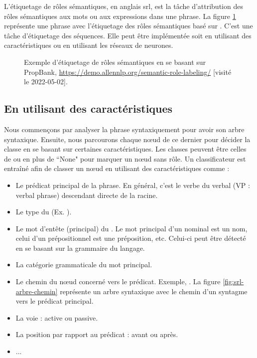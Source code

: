 \documentclass{KodeBook}
\begin{document}
L'étiquetage de rôles sémantiques, en anglais \ac{srl}, est la tâche d'attribution des rôles sémantiques aux mots ou aux expressions dans une phrase.
La figure \ref{fig:srl-exp} représente une phrase avec l'étiquetage des rôles sémantiques basé sur .
C'est une tâche d'étiquetage des séquences. 
Elle peut être implémentée soit en utilisant des caractéristiques ou en utilisant les réseaux de neurones.

\begin{figure}[ht]
	\centering
	\caption[Exemple d'étiquetage de rôles sémantiques en se basant sur PropBank.]{Exemple d'étiquetage de rôles sémantiques en se basant sur PropBank, \url{https://demo.allennlp.org/semantic-role-labeling/} [visité le 2022-05-02].}
	\label{fig:srl-exp}
\end{figure}

\subsection{En utilisant des caractéristiques}

Nous commençons par analyser la phrase syntaxiquement pour avoir son arbre syntaxique. 
Ensuite, nous parcourons chaque nœud de ce dernier pour décider la classe en se basant sur certaines caractéristiques. 
Les classes peuvent être celles de  ou  en plus de ``None" pour marquer un nœud sans rôle.
Un classificateur est entraîné afin de classer un nœud en utilisant des caractéristiques comme :
\begin{itemize}
	\item Le prédicat principal de la phrase. En général, c'est le verbe du  verbal (VP : verbal phrase) descendant directe de la racine.
	\item Le type du  (Ex. ).
	\item Le mot d'entête (principal) du . 
	Le mot principal d'un  nominal est un nom, celui d'un  prépositionnel est une préposition, etc. 
	Celui-ci peut être détecté en se basant sur la grammaire du langage.
	\item La catégorie grammaticale du mot principal.
	\item Le chemin du nœud concerné vers le prédicat. 
	Exemple, .
	La figure \ref{fig:srl-arbre-chemin} représente un arbre syntaxique avec le chemin d'un syntagme vers le prédicat principal.
	\item La voie : active ou passive.
	\item La position par rapport au prédicat : avant ou après.
	\item ...
\end{itemize}
\end{document}
